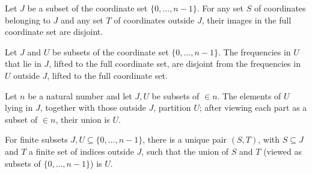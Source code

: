 \begin{theorem}
\label{FABL.disjoint_liftFreeFrequency_liftFixedFrequency}
\leanok
{}
Let $J$ be a subset of the coordinate set $\{0,\ldots,n-1\}$. For any set $S$ of
coordinates belonging to $J$ and any set $T$ of coordinates outside $J$, their images in
the full coordinate set are disjoint.
\end{theorem}

\begin{theorem}
\label{FABL.disjoint_liftFreeFrequencyPart_liftFixedFrequencyPart}
\leanok
{}
Let $J$ and $U$ be subsets of the coordinate set $\{0,\ldots,n-1\}$. The frequencies in
$U$ that lie in $J$, lifted to the full coordinate set, are disjoint from the
frequencies in $U$ outside $J$, lifted to the full coordinate set.
\end{theorem}

\begin{theorem}
\label{FABL.liftFreeFrequencyPart_union_liftFixedFrequencyPart}
\leanok
{}
Let $n$ be a natural number and let $J,U$ be subsets of $\in n$. The elements of $U$
lying in $J$, together with those outside $J$, partition $U$; after viewing each part as
a subset of $\in n$, their union is $U$.
\end{theorem}

\begin{theorem}
\label{FABL.existsUnique_frequency_split}
\leanok
{}
For finite subsets $J,U\subseteq\{0,\ldots,n-1\}$, there is a unique pair $(S,T)$, with
$S\subseteq J$ and $T$ a finite set of indices outside $J$, such that the union of $S$
and $T$ (viewed as subsets of $\{0,\ldots,n-1\}$) is $U$.
\end{theorem}

